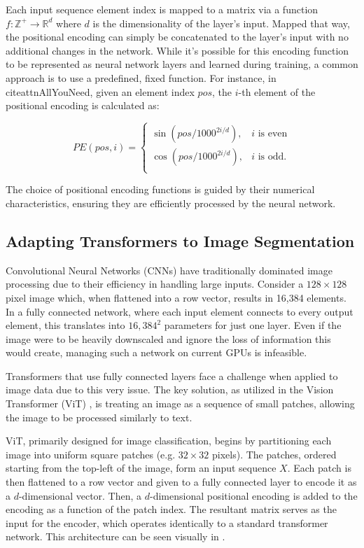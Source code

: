 Each input sequence element index is mapped to a matrix via a function $f : \mathbb{Z}^{+} \rightarrow \mathbb{R}^d$ where $d$ is the dimensionality of the layer's input. Mapped that way, the positional encoding can simply be concatenated to the layer's input with no additional changes in the network. While it's possible for this encoding function to be represented as neural network layers and learned during training, a common approach is to use a predefined, fixed function. For instance, in cite{attnAllYouNeed}, given an element index $pos$, the $i$-th element of the positional encoding is calculated as:

\begin{equation}
PE(pos, i) = \begin{cases}
	\sin(pos/1000^{2i/d}), & \text{$i$ is even}\\
	\cos(pos/1000^{2i/d}), & \text{$i$ is odd.}\\
\end{cases}
\end{equation}

The choice of positional encoding functions is guided by their numerical characteristics, ensuring they are efficiently processed by the neural network.
  
 \subsection{Adapting Transformers to Image Segmentation}
 
 Convolutional Neural Networks (CNNs) have traditionally dominated image processing due to their efficiency in handling large inputs. Consider a $128 \times 128$ pixel image which, when flattened into a row vector, results in 16,384 elements. In a fully connected network, where each input element connects to every output element, this translates into $16,384^2$ parameters for just one layer. Even if the image were to be heavily downscaled and ignore the loss of information this would create, managing such a network on current GPUs is infeasible.
 
 Transformers that use fully connected layers face a challenge when applied to image data due to this very issue. The key solution, as utilized in the Vision Transformer (ViT) \cite{dosovitskiy2021an}, is treating an image as a sequence of small patches, allowing the image to be processed similarly to text.
 
 ViT, primarily designed for image classification, begins by partitioning each image into uniform square patches (e.g. $32 \times 32$ pixels). The patches, ordered starting from the top-left of the image, form an input sequence $X$. Each patch is then flattened to a row vector and given to a fully connected layer to encode it as a $d$-dimensional vector. Then, a $d$-dimensional positional encoding is added to the encoding as a function of the patch index. The resultant matrix serves as the input for the encoder, which operates identically to a standard transformer network. This architecture can be seen visually in .
 
